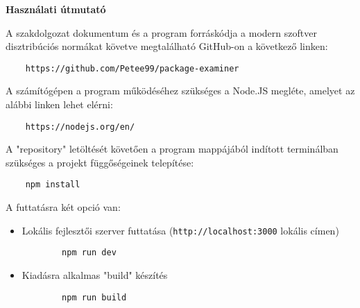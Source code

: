 \pagestyle{empty}

\noindent \textbf{\Large Használati útmutató}

\vskip 1cm

A szakdolgozat dokumentum és a program forráskódja a modern szoftver disztribúciós normákat követve megtalálható GitHub-on a következő linken:

\begin{verbatim}
	https://github.com/Petee99/package-examiner
\end{verbatim}

A számítógépen a program működéséhez szükséges a Node.JS megléte, amelyet az alábbi linken lehet elérni:

\begin{verbatim}
	https://nodejs.org/en/
\end{verbatim}

A "repository" letöltését követően a program mappájából indított terminálban szükséges a projekt függőségeinek telepítése:

\begin{verbatim}
	npm install
\end{verbatim}

A futtatásra két opció van:

\begin{itemize}
	\item Lokális fejlesztői szerver futtatása (\texttt{http://localhost:3000} lokális címen)
	\begin{verbatim}
		npm run dev
	\end{verbatim}
	\item Kiadásra alkalmas "build" készítés
	\begin{verbatim}
		npm run build
	\end{verbatim}
\end{itemize}

